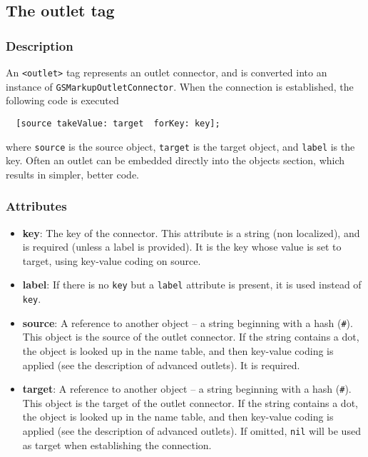 \subsection{The outlet tag}

\subsubsection{Description}
An \texttt{<outlet>} tag represents an outlet connector, and is converted
into an instance of \texttt{GSMarkupOutletConnector}.  When the connection is
established, the following code is executed
\begin{verbatim}
  [source takeValue: target  forKey: key];
\end{verbatim}
where \texttt{source} is the source object, \texttt{target} is the
target object, and \texttt{label} is the key.  Often an outlet can be
embedded directly into the objects section, which results in simpler,
better code.

\subsubsection{Attributes}
\begin{itemize}
\item {\bf key}: The key of the connector.  This attribute is a string 
(non localized), and is required (unless a label is provided).  It is
the key whose value is set to target, using key-value coding on
source.
\item {\bf label}: If there is no \texttt{key} but a \texttt{label} attribute
is present, it is used instead of \texttt{key}.
\item {\bf source}: A reference to another object -- a string beginning with
a hash (\texttt{\#}).  This object is the source of the outlet
connector.  If the string contains a dot, the object is looked up in
the name table, and then key-value coding is applied (see the
description of advanced outlets).  It is required.
\item {\bf target}: A reference to another object -- a string beginning with
a hash (\texttt{\#}).  This object is the target of the outlet
connector.  If the string contains a dot, the object is looked up in
the name table, and then key-value coding is applied (see the
description of advanced outlets).  If omitted, \texttt{nil} will be
used as target when establishing the connection.
\end{itemize}

